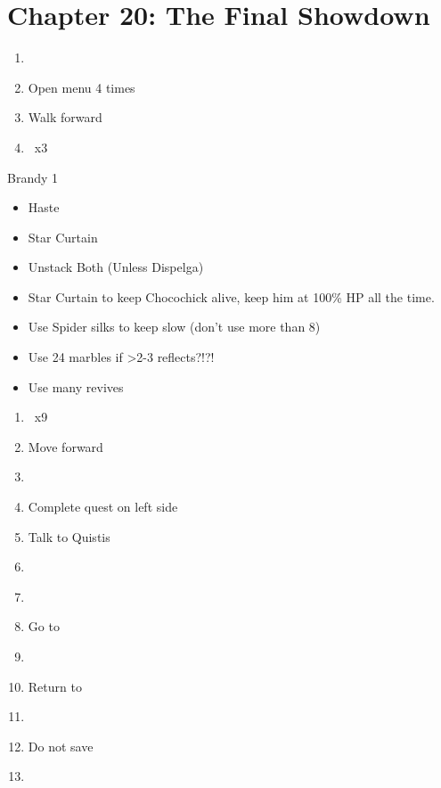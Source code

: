\chapter{Chapter 20: The Final Showdown}
\begin{enumerate}
    \item \cs\
    \item Open menu 4 times
    \item Walk forward
    \item \cs\ x3
\end{enumerate}
\begin{battle}[]{Brandy 1}
    \begin{itemize}
        \item Haste \reynn\
        \item Star Curtain \reynn\
        \item Unstack Both (Unless Dispelga)
        \item Star Curtain to keep Chocochick alive, keep him at 100\% HP all the time.
        \item Use Spider silks to keep slow (don’t use more than 8)
        \item Use 24 marbles if >2-3 reflects?!?!
        \item Use many revives
    \end{itemize}
\end{battle}
\begin{enumerate}[resume]
    \item \cs\ x9
    \item Move forward
    \item \cs\
    \item Complete quest on left side
    \item Talk to Quistis
    \item \cs\
    \item {}
    \item Go to 
    \item \cs\
    \item Return to 
    \item \cs\
    \item Do not save
    \item \cs\
\end{enumerate}